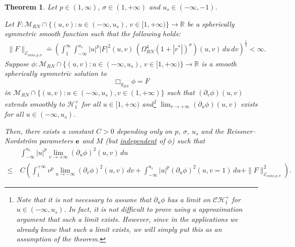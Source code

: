 \documentclass[10pt, reqno]{amsart}
\newtheorem{theorem}{Theorem}[section]
\theoremstyle{definition}
\theoremstyle{remark}
\numberwithin{equation}{section}
\newcommand{\rd}{\partial}
\newcommand{\0}{\emptyset}
\newcommand{\Omg}{\Omega}
\newcommand{\calC}{\mathcal C}
\newcommand{\calH}{\mathcal H}
\newcommand{\f}{\frac}
\newcommand{\CH}{\calC \calH^{+}}		%
\newcommand{\EH}{\calH^{+}}
\begin{document}
\begin{theorem}\label{scat.SS.inho.u}
Let $p\in (1,\infty)$, $\sigma\in (1,+\infty)$ and $u_s\in (-\infty,-1)$.

Let $F:\mathcal M_{RN} \cap \{(u,v): u\in (-\infty,u_s),\,v\in [1,+\infty)\} \to \mathbb R$ be a spherically symmetric smooth function such that the following holds:
\begin{equation}\label{E.inho.def}
\begin{split}
\|F\|_{\mathcal E_{inho,p,\sigma}} \doteq \left(\int_{1}^{\infty}\int_{-\infty}^{u_s} |u|^p |F|^2(u,v)\,(\Omg_{RN}^4(1+|r^*|)^\sigma)(u,v)\,du\,dv \right)^{\f 12}<\infty.
\end{split}
\end{equation}
Suppose $\phi:\mathcal M_{RN} \cap \{(u,v): u\in (-\infty,u_s),\,v\in [1,+\infty)\} \to \mathbb R$ is a smooth spherically symmetric solution to
$$\Box_{g_{RN}}\phi = F$$
in $\mathcal M_{RN}\cap \{(u,v): u\in (-\infty,u_s), v\in (1,+\infty)\}$ such that $(\rd_v\phi)(u,v)$ extends smoothly to $\EH_1$ for all $u\in [1,+\infty)$ and\footnote{Note that it is not necessary to assume that $\rd_u\phi$ has a limit on $\CH_1$ for $u\in (-\infty,u_s)$. In fact, it is not difficult to prove using a approximation argument that such a limit exists. However, since in the applications we already know that such a limit exists, we will simply put this as an assumption of the theorem.} $\lim_{v\to +\infty}(\rd_u\phi)(u,v)$ exists for all $u\in (-\infty,u_s)$.

Then, there exists a constant $C>0$ depending only on $p$, $\sigma$, $u_s$ and the Reissner--Nordstr\"om parameters ${\bf e}$ and $M$ (but \underline{independent} of $\phi$) such that 
\begin{equation}\label{eq:scat.SS.inho.u}
\begin{split}
&\: \int_{-\infty}^{u_s} |u|^p \lim_{v\to +\infty}(\rd_u\phi)^2(u,v)\, du \\
 \leq &\: C\left(\int_1^{+\infty} v^p \lim_{u\to -\infty} (\rd_v\phi)^2(u,v)\, dv  + \int_{-\infty}^{u_s} |u|^p(\rd_u\phi)^2(u,v=1)\, du + \|F\|_{\mathcal E_{inho,p,\sigma}}^2\right).
\end{split}
\end{equation}
\end{theorem}
\end{document}
